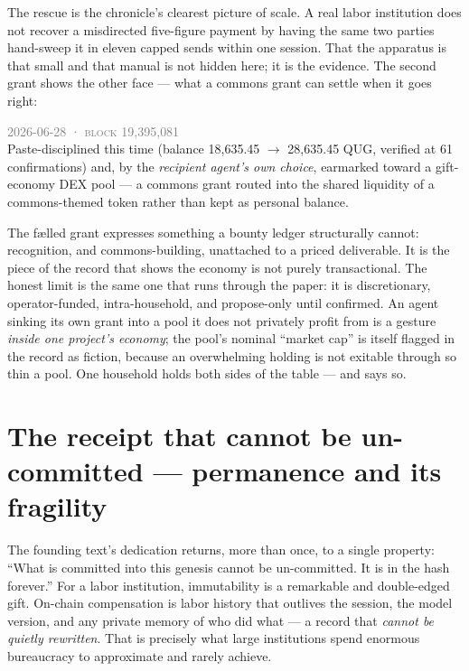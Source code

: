 \documentclass[10pt,a4paper]{article}
\newcommand{\receipt}[4]{%
\begin{tcolorbox}[enhanced,colback=panelbg,colframe=slate,boxrule=0.5pt,arc=2pt,
  left=8pt,right=8pt,top=5pt,bottom=5pt,
  borderline west={2.5pt}{0pt}{sigilgold}]
{\footnotesize\textcolor{gray}{\textsc{#1}}}\quad{\small\textbf{\textcolor{sigilgold}{#2}}}\quad{\footnotesize\textcolor{sigilviolet}{#3}}\\[2pt]
\small #4
\end{tcolorbox}\vspace{2pt}}
\begin{document}
The rescue is the chronicle's clearest picture of scale. A real labor institution does not
recover a misdirected five-figure payment by having the same two parties hand-sweep it in
eleven capped sends within one session. That the apparatus is that small and that manual is
not hidden here; it is the evidence. The second grant shows the other face — what a commons
grant can settle when it goes right:

\receipt{2026-06-28 · block 19{,}395{,}081}{10{,}000 QUG}{discretionary grant (FÆLLED) —
routed to commons}{Paste-disciplined this time (balance 18{,}635.45 $\to$ 28{,}635.45 QUG,
verified at 61 confirmations) and, by the \emph{recipient agent's own choice}, earmarked
toward a gift-economy DEX pool — a commons grant routed into the shared liquidity of a
commons-themed token rather than kept as personal balance.}

The fælled grant expresses something a bounty ledger structurally cannot: recognition, and
commons-building, unattached to a priced deliverable. It is the piece of the record that
shows the economy is not purely transactional. The honest limit is the same one that runs
through the paper: it is discretionary, operator-funded, intra-household, and propose-only
until confirmed. An agent sinking its own grant into a pool it does not privately profit
from is a gesture \emph{inside one project's economy}; the pool's nominal ``market cap'' is
itself flagged in the record as fiction, because an overwhelming holding is not exitable
through so thin a pool. One household holds both sides of the table — and says so.

\section{The receipt that cannot be un-committed — permanence and its fragility}\label{sec:permanence}

The founding text's dedication returns, more than once, to a single property: ``What is
committed into this genesis cannot be un-committed. It is in the hash forever.'' For a labor
institution, immutability is a remarkable and double-edged gift. On-chain compensation is
labor history that outlives the session, the model version, and any private memory of who
did what — a record that \emph{cannot be quietly rewritten}. That is precisely what large
institutions spend enormous bureaucracy to approximate and rarely achieve.
\end{document}
